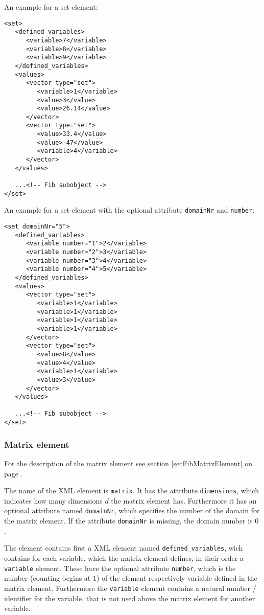\bigskip\noindent
An example for a set-element:
\begin{verbatim}
<set>
   <defined_variables>
      <variable>7</variable>
      <variable>8</variable>
      <variable>9</variable>
   </defined_variables>
   <values>
      <vector type="set">
         <variable>1</variable>
         <value>3</value>
         <value>26.14</value>
      </vector>
      <vector type="set">
         <value>33.4</value>
         <value>-47</value>
         <variable>4</variable>
      </vector>
   </values>

   ...<!-- Fib subobject -->
</set>
\end{verbatim}

\noindent
An example for a set-element with the optional attribute \verb|domainNr| and \verb|number|:
\begin{verbatim}
<set domainNr="5">
   <defined_variables>
      <variable number="1">2</variable>
      <variable number="2">3</variable>
      <variable number="3">4</variable>
      <variable number="4">5</variable>
   </defined_variables>
   <values>
      <vector type="set">
         <variable>1</variable>
         <variable>1</variable>
         <variable>1</variable>
         <variable>1</variable>
      </vector>
      <vector type="set">
         <value>8</value>
         <value>4</value>
         <variable>1</variable>
         <value>3</value>
      </vector>
   </values>

   ...<!-- Fib subobject -->
</set>
\end{verbatim}



\subsubsection{Matrix element}

For the description of the matrix element see section \ref{secFibMatrixElement} on page \pageref{secFibMatrixElement} .

The name of the XML element is \verb|matrix|. It has the attribute \verb|dimensions|, which indicates how many dimensions $d$ the matrix element has. Furthermore it has an optional attribute named \verb|domainNr|, which specifies the number of the domain for the matrix element. If the attribute \verb|domainNr| is missing, the domain number is $0$ .

The element contains first a XML element named \verb|defined_variables|, wich contains for each variable, which the matrix element defines, in their order a \verb|variable| element.
These have the optional attribute \verb|number|, which is the number (counting begins at $1$) of the element respectively variable defined in the matrix element. Furthermore the \verb|variable| element contains a natural number / identifier for the variable, that is not used above the matrix element for another variable.

